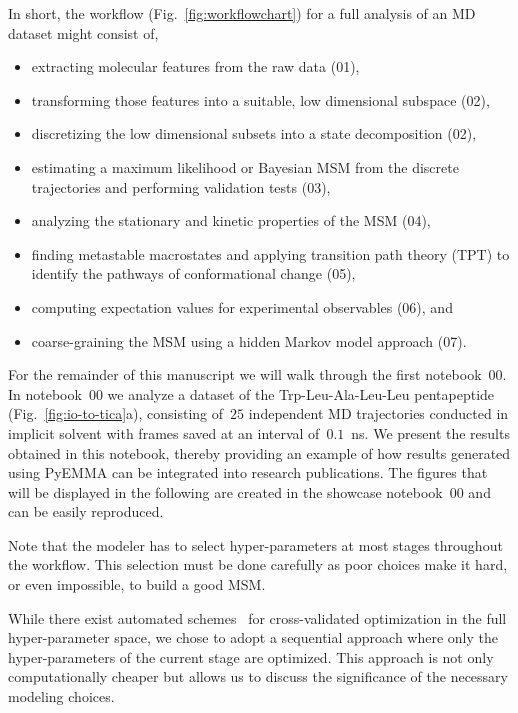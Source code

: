 \documentclass[9pt,tutorial]{livecoms}
\begin{document}
In short, the workflow (Fig.~\ref{fig:workflowchart}) for a full analysis of an MD dataset might consist of,
\begin{itemize}
	\item extracting molecular features from the raw data (01),
	\item transforming those features into a suitable, low dimensional subspace (02),
	\item discretizing the low dimensional subsets into a state decomposition (02),
	\item estimating a maximum likelihood or Bayesian MSM from the discrete trajectories and performing validation tests (03),
	\item analyzing the stationary and kinetic properties of the MSM (04),
	\item finding metastable macrostates and applying transition path theory (TPT) to identify the pathways of conformational change (05),
	\item computing expectation values for experimental observables (06), and
	\item coarse-graining the MSM using a hidden Markov model approach (07).
\end{itemize}

For the remainder of this manuscript we will walk through the first notebook~00.
In notebook~00 we analyze a dataset of the Trp-Leu-Ala-Leu-Leu pentapeptide (Fig.~\ref{fig:io-to-tica}a),
consisting of~$25$ independent MD trajectories conducted in implicit solvent with frames saved at an interval of~$0.1$~ns.
We present the results obtained in this notebook,
thereby providing an example of how results generated using PyEMMA can be integrated into research publications.
The figures that will be displayed in the following are created in the showcase notebook~00 and can be easily reproduced.

Note that the modeler has to select hyper-parameters at most stages throughout the workflow.
This selection must be done carefully as poor choices make it hard, or even impossible, to build a good MSM.

While there exist automated schemes~\cite{husic-optimized} for cross-val\-i\-dat\-ed optimization in the full hyper-parameter space,
we chose to adopt a sequential approach where only the hyper-parameters of the current stage are optimized.
This approach is not only computationally cheaper but allows us to discuss the significance of the necessary modeling choices.
\end{document}
